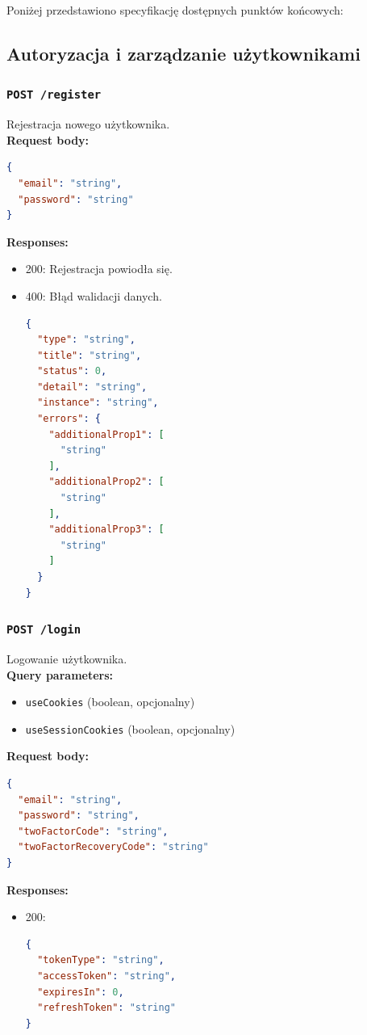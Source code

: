 Poniżej przedstawiono specyfikację dostępnych punktów końcowych:

\subsection{Autoryzacja i zarządzanie użytkownikami}
\subsubsection{\lstinline[language=http]{POST /register}}
Rejestracja nowego użytkownika. \\
\textbf{Request body:}
\begin{lstlisting}[language=json]
{
  "email": "string",
  "password": "string"
}
\end{lstlisting}
\textbf{Responses:}
\begin{itemize}
    \item 200: Rejestracja powiodła się.
    \item 400: Błąd walidacji danych.
\begin{lstlisting}[language=json]
{
  "type": "string",
  "title": "string",
  "status": 0,
  "detail": "string",
  "instance": "string",
  "errors": {
    "additionalProp1": [
      "string"
    ],
    "additionalProp2": [
      "string"
    ],
    "additionalProp3": [
      "string"
    ]
  }
}
\end{lstlisting}
\end{itemize}

\subsubsection{\lstinline[language=http]{POST /login}}
Logowanie użytkownika. \\
\textbf{Query parameters:}
\begin{itemize}
    \item \texttt{useCookies} (boolean, opcjonalny)
    \item \texttt{useSessionCookies} (boolean, opcjonalny)
\end{itemize}
\textbf{Request body:}
\begin{lstlisting}[language=json]
{
  "email": "string",
  "password": "string",
  "twoFactorCode": "string",
  "twoFactorRecoveryCode": "string"
}
\end{lstlisting}
\textbf{Responses:}
\begin{itemize}
    \item 200:
\begin{lstlisting}[language=json]
{
  "tokenType": "string",
  "accessToken": "string",
  "expiresIn": 0,
  "refreshToken": "string"
}
\end{lstlisting}
\end{itemize}

